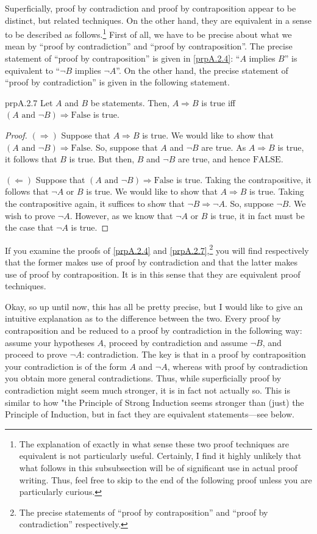 Superficially, proof by contradiction and proof by contraposition appear to be distinct, but related techniques.  On the other hand, they are equivalent in a sense to be described as follows.\footnote{The explanation of exactly in what sense these two proof techniques are equivalent is not particularly useful.  Certainly, I find it highly unlikely that what follows in this subsubsection will be of significant use in actual proof writing.  Thus, feel free to skip to the end of the following proof unless you are particularly curious.}  First of all, we have to be precise about what we mean by ``proof by contradiction'' and ``proof by contraposition''.  The precise statement of ``proof by contraposition'' is given in \cref{prpA.2.4}:  ``$A$ implies $B$'' is equivalent to ``$\neg B$ implies $\neg A$''.  On the other hand, the precise statement of ``proof by contradiction'' is given in the following statement.
\begin{prp}{}{prpA.2.7}
Let $A$ and $B$ be statements.  Then, $A\Rightarrow B$ is true iff $(A\text{ and }\neg B)\Rightarrow \text{False}$ is true.
\begin{proof}
$(\Rightarrow )$ Suppose that $A\Rightarrow B$ is true.   We would like to show that $(A\text{ and }\neg B)\Rightarrow \text{False}$.  So, suppose that $A$ and $\neg B$ are true.  As $A\Rightarrow B$ is true, it follows that $B$ is true.  But then, $B$ and $\neg B$ are true, and hence $\text{FALSE}$.

\blankline
\noindent
$(\Leftarrow )$ Suppose that $(A\text{ and }\neg B)\Rightarrow \text{False}$ is true.  Taking the contrapositive, it follows that $\neg A$ or $B$ is true.  We would like to show that $A\Rightarrow B$ is true.  Taking the contrapositive again, it suffices to show that $\neg B\Rightarrow \neg A$.  So, suppose $\neg B$.  We wish to prove $\neg A$.  However, as we know that $\neg A$ or $B$ is true, it in fact must be the case that $\neg A$ is true. 
\end{proof}
\end{prp}
If you examine the proofs of \cref{prpA.2.4} and \cref{prpA.2.7},\footnote{The precise statements of ``proof by contraposition'' and ``proof by contradiction'' respectively.} you will find respectively that the former makes use of proof by contradiction and that the latter makes use of proof by contraposition.  It is in this sense that they are equivalent proof techniques.

Okay, so up until now, this has all be pretty precise, but I would like to give an intuitive explanation as to the difference between the two.  Every proof by contraposition and be reduced to a proof by contradiction in the following way:  assume your hypotheses $A$, proceed by contradiction and assume $\neg B$, and proceed to prove $\neg A$:  contradiction.  The key is that in a proof by contraposition your contradiction is of the form $A$ and $\neg A$, whereas with proof by contradiction you obtain more general contradictions.  Thus, while superficially proof by contradiction might seem much stronger, it is in fact not actually so.  This is similar to how "the Principle of Strong Induction seems stronger than (just) the Principle of Induction, but in fact they are equivalent statements---see below.

